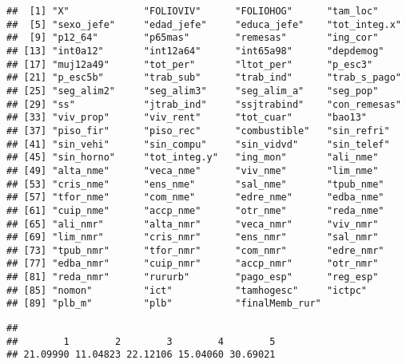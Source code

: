 \documentclass[11pt,]{article}
\newenvironment{Shaded}{\begin{snugshade}}{\end{snugshade}}
\newcommand{\KeywordTok}[1]{\textcolor[rgb]{0.13,0.29,0.53}{\textbf{#1}}}
\newcommand{\DecValTok}[1]{\textcolor[rgb]{0.00,0.00,0.81}{#1}}
\newcommand{\StringTok}[1]{\textcolor[rgb]{0.31,0.60,0.02}{#1}}
\newcommand{\OperatorTok}[1]{\textcolor[rgb]{0.81,0.36,0.00}{\textbf{#1}}}
\newcommand{\NormalTok}[1]{#1}
\begin{document}
\begin{verbatim}
##  [1] "X"             "FOLIOVIV"      "FOLIOHOG"      "tam_loc"      
##  [5] "sexo_jefe"     "edad_jefe"     "educa_jefe"    "tot_integ.x"  
##  [9] "p12_64"        "p65mas"        "remesas"       "ing_cor"      
## [13] "int0a12"       "int12a64"      "int65a98"      "depdemog"     
## [17] "muj12a49"      "tot_per"       "ltot_per"      "p_esc3"       
## [21] "p_esc5b"       "trab_sub"      "trab_ind"      "trab_s_pago"  
## [25] "seg_alim2"     "seg_alim3"     "seg_alim_a"    "seg_pop"      
## [29] "ss"            "jtrab_ind"     "ssjtrabind"    "con_remesas"  
## [33] "viv_prop"      "viv_rent"      "tot_cuar"      "bao13"        
## [37] "piso_fir"      "piso_rec"      "combustible"   "sin_refri"    
## [41] "sin_vehi"      "sin_compu"     "sin_vidvd"     "sin_telef"    
## [45] "sin_horno"     "tot_integ.y"   "ing_mon"       "ali_nme"      
## [49] "alta_nme"      "veca_nme"      "viv_nme"       "lim_nme"      
## [53] "cris_nme"      "ens_nme"       "sal_nme"       "tpub_nme"     
## [57] "tfor_nme"      "com_nme"       "edre_nme"      "edba_nme"     
## [61] "cuip_nme"      "accp_nme"      "otr_nme"       "reda_nme"     
## [65] "ali_nmr"       "alta_nmr"      "veca_nmr"      "viv_nmr"      
## [69] "lim_nmr"       "cris_nmr"      "ens_nmr"       "sal_nmr"      
## [73] "tpub_nmr"      "tfor_nmr"      "com_nmr"       "edre_nmr"     
## [77] "edba_nmr"      "cuip_nmr"      "accp_nmr"      "otr_nmr"      
## [81] "reda_nmr"      "rururb"        "pago_esp"      "reg_esp"      
## [85] "nomon"         "ict"           "tamhogesc"     "ictpc"        
## [89] "plb_m"         "plb"           "finalMemb_rur"
\end{verbatim}

\begin{Shaded}
\end{Shaded}

\begin{verbatim}
## 
##        1        2        3        4        5 
## 21.09990 11.04823 22.12106 15.04060 30.69021
\end{verbatim}
\end{document}
